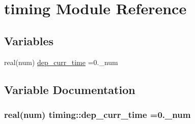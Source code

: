 \hypertarget{namespacetiming}{}\section{timing Module Reference}
\label{namespacetiming}
\subsection*{Variables}
\begin{DoxyCompactItemize}
\item 
real(num) \hyperlink{namespacetiming_ae300cb5fe1ec6e74c106d185c36e1cfa}{dep\+\_\+curr\+\_\+time} =0.\+\_\+num
\end{DoxyCompactItemize}


\subsection{Variable Documentation}
\subsubsection[{\texorpdfstring{dep\+\_\+curr\+\_\+time}{dep_curr_time}}]{\setlength{\rightskip}{0pt plus 5cm}real(num) timing\+::dep\+\_\+curr\+\_\+time =0.\+\_\+num}\hypertarget{namespacetiming_ae300cb5fe1ec6e74c106d185c36e1cfa}{}\label{namespacetiming_ae300cb5fe1ec6e74c106d185c36e1cfa}
